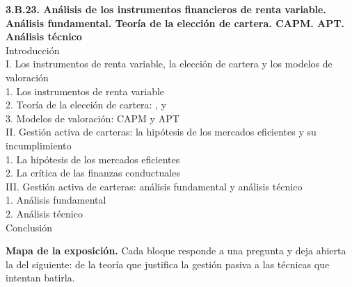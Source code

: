 \documentclass[11pt]{article}
\begin{document}
\begin{esquema}
\textbf{3.B.23. Análisis de los instrumentos financieros de renta variable. Análisis fundamental. Teoría de la elección de cartera. CAPM. APT. Análisis técnico}\\[2pt]
Introducción\\
I. Los instrumentos de renta variable, la elección de cartera y los modelos de valoración\\
\hspace*{1.5em}1. Los instrumentos de renta variable\\
\hspace*{1.5em}2. Teoría de la elección de cartera: ,  y \\
\hspace*{1.5em}3. Modelos de valoración: CAPM y APT\\
II. Gestión activa de carteras: la hipótesis de los mercados eficientes y su incumplimiento\\
\hspace*{1.5em}1. La hipótesis de los mercados eficientes\\
\hspace*{1.5em}2. La crítica de las finanzas conductuales\\
III. Gestión activa de carteras: análisis fundamental y análisis técnico\\
\hspace*{1.5em}1. Análisis fundamental\\
\hspace*{1.5em}2. Análisis técnico\\
Conclusión
\end{esquema}

\begin{anotaciones}
\textbf{Mapa de la exposición.} Cada bloque responde a una pregunta y deja abierta la del siguiente: de la teoría que justifica la gestión pasiva a las técnicas que intentan batirla.
\begin{infografiacaja}
\caption{Mapa del tema: la pregunta de cada bloque y el hilo que los une}\label{figu:mapa-tema}
\end{infografiacaja}
\end{anotaciones}
\end{document}
